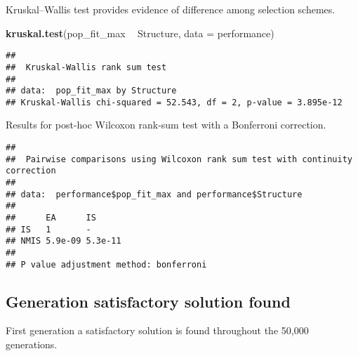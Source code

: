 \documentclass[]{book}
\newenvironment{Shaded}{\begin{snugshade}}{\end{snugshade}}
\newcommand{\DataTypeTok}[1]{\textcolor[rgb]{0.13,0.29,0.53}{#1}}
\newcommand{\KeywordTok}[1]{\textcolor[rgb]{0.13,0.29,0.53}{\textbf{#1}}}
\newcommand{\NormalTok}[1]{#1}
\newcommand{\OperatorTok}[1]{\textcolor[rgb]{0.81,0.36,0.00}{\textbf{#1}}}
\newcommand{\OtherTok}[1]{\textcolor[rgb]{0.56,0.35,0.01}{#1}}
\newcommand{\StringTok}[1]{\textcolor[rgb]{0.31,0.60,0.02}{#1}}
\begin{document}
Kruskal--Wallis test provides evidence of difference among selection schemes.

\begin{Shaded}
\begin{Highlighting}[]
\KeywordTok{kruskal.test}\NormalTok{(pop_fit_max }\OperatorTok{~}\StringTok{ }\NormalTok{Structure, }\DataTypeTok{data =}\NormalTok{ performance)}
\end{Highlighting}
\end{Shaded}

\begin{verbatim}
## 
##  Kruskal-Wallis rank sum test
## 
## data:  pop_fit_max by Structure
## Kruskal-Wallis chi-squared = 52.543, df = 2, p-value = 3.895e-12
\end{verbatim}

Results for post-hoc Wilcoxon rank-sum test with a Bonferroni correction.

\begin{Shaded}
\end{Shaded}

\begin{verbatim}
## 
##  Pairwise comparisons using Wilcoxon rank sum test with continuity correction 
## 
## data:  performance$pop_fit_max and performance$Structure 
## 
##      EA      IS     
## IS   1       -      
## NMIS 5.9e-09 5.3e-11
## 
## P value adjustment method: bonferroni
\end{verbatim}

\hypertarget{generation-satisfactory-solution-found-7}{%
\subsection{Generation satisfactory solution found}\label{generation-satisfactory-solution-found-7}}

First generation a satisfactory solution is found throughout the 50,000 generations.
\end{document}
